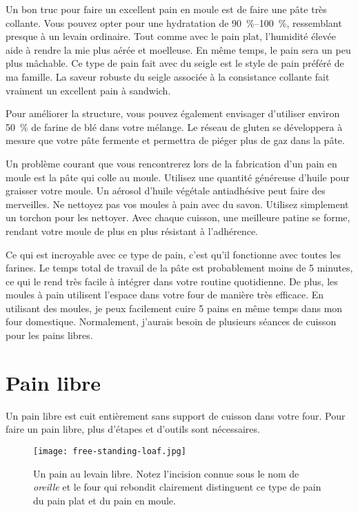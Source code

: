 Un bon truc pour faire un excellent pain en moule est de faire une pâte très collante. Vous pouvez opter pour une hydratation de \qtyrange{90}{100}{\percent}, ressemblant presque à un levain ordinaire. Tout comme avec le pain plat, l'humidité élevée aide à rendre la mie plus aérée et moelleuse. En même temps, le pain sera un peu plus mâchable. Ce type de pain fait avec du seigle est le style de pain préféré de ma famille. La saveur robuste du seigle associée à la consistance collante fait vraiment un excellent pain à sandwich.

Pour améliorer la structure, vous pouvez également envisager d'utiliser environ \qty{50}{\percent} de farine de blé dans votre mélange. Le réseau de gluten se développera à mesure que votre pâte fermente et permettra de piéger plus de gaz dans la pâte.

Un problème courant que vous rencontrerez lors de la fabrication d'un pain en moule est la pâte qui colle au moule. Utilisez une quantité généreuse d'huile pour graisser votre moule. Un aérosol d'huile végétale antiadhésive peut faire des merveilles. Ne nettoyez pas vos moules à pain avec du savon. Utilisez simplement un torchon pour les nettoyer. Avec chaque cuisson, une meilleure patine se forme, rendant votre moule de plus en plus résistant à l'adhérence.

Ce qui est incroyable avec ce type de pain, c'est qu'il fonctionne avec toutes les farines. Le temps total de travail de la pâte est probablement moins de 5 minutes, ce qui le rend très facile à intégrer dans votre routine quotidienne. De plus, les moules à pain utilisent l'espace dans votre four de manière très efficace. En utilisant des moules, je peux facilement cuire 5 pains en même temps dans mon four domestique. Normalement, j'aurais besoin de plusieurs séances de cuisson pour les pains libres.

\section{Pain libre}

Un pain libre est cuit entièrement sans support de cuisson dans votre four. Pour faire un pain libre, plus d'étapes et d'outils sont nécessaires.

\begin{figure}[!htb]
\begin{center}
  \texttt{[image: free-standing-loaf.jpg]}
  \caption[Pain au levain libre]{Un pain au levain libre. Notez
      l'incision connue sous le nom de \emph{oreille} et le four qui rebondit clairement
      distinguent ce type de pain du pain plat et du pain en moule.}
\end{center}
\end{figure}

